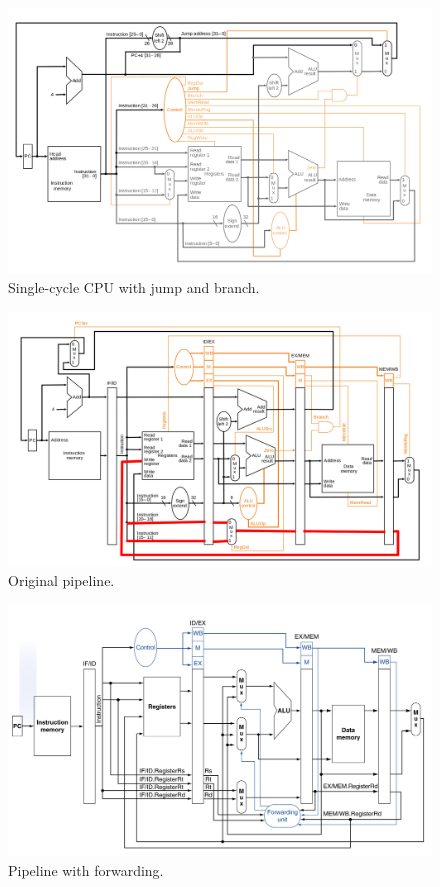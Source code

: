 \begin{figure}[H]
    \centering
    \includegraphics[scale=0.3]{img/single-cycle-cpu.png}
    \caption{Single-cycle CPU with jump and branch.}
    \label{img:single-cycle-cpu}
\end{figure}

\begin{figure}[H]
    \centering
    \includegraphics[scale=0.3]{img/pipeline-org.png}
    \caption{Original pipeline.}
    \label{img:pipeline-org}
\end{figure}

\begin{figure}[H]
    \centering
    \includegraphics[scale=0.3]{img/pipeline-forward.png}
    \caption{Pipeline with forwarding.}
    \label{img:pipeline-forward}
\end{figure}

